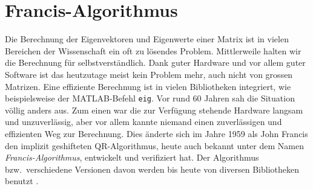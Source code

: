 \newcommand{\norm}[1]{\left\lVert#1\right\rVert}


\chapter{Francis-Algorithmus\label{chapter:francis}}

\begin{refsection}
{\parindent 0pt
Die} Berechnung der Eigenvektoren und Eigenwerte einer Matrix ist in vielen Bereichen der Wissenschaft ein oft zu lösendes Problem.
%
%
%
%
Mittlerweile halten wir die Berechnung für selbstverständlich.
Dank guter Hardware und vor allem guter Software ist das heutzutage meist kein Problem mehr, auch nicht von grossen Matrizen.
Eine effiziente Berechnung ist in vielen Bibliotheken integriert, wie beispielsweise der MATLAB-Befehl \texttt{eig}.
%
%
Vor rund 60 Jahren sah die Situation völlig anders aus.
Zum einen war die zur Verfügung stehende Hardware langsam und unzuverlässig, aber vor allem kannte niemand einen zuverlässigen und effizienten Weg zur Berechnung.
Dies änderte sich im Jahre 1959 als John Francis den implizit geshifteten QR-Algorithmus, heute auch bekannt unter dem Namen \emph{Francis-Algorithmus}, entwickelt und verifiziert hat.
%
%
Der Algorithmus bzw.~verschiedene Versionen davon werden bis heute
von diversen Bibliotheken benutzt \cite{francis:watkins_paper}.


\end{refsection}

